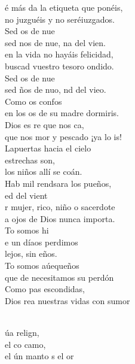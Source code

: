 \documentclass[12pt]{article}
\begin{document}
\begin{multicols*}{2}
\begin{cancion}%
	é más da la etiqueta que ponéis,\\
	no juzguéis y no seréiuzgados.\\
	Sed os de nue \\
	sed nos de nue, na del vien. \\
	 en la vida no hayáis felicidad,\\
	buscad vuestro tesoro ondido.\\
	Sed os de nue \\
	sed ños de nuo, nd del vieo.\\
	Como os confos \\
	en los os de su madre dormiris.\\
	Dios es re que nos ca,\\
	que nos mor y pescado ¡ya lo is!\\
	Lapuertas hacia el cielo \\
estrechas son,\\
	los niños allí se coán.\\
	Hab mil rendsara los pueños,\\
	ed del vient\\
	r mujer, rico, niño o sacerdote\\
	a ojos de Dios nunca importa.\\
	To somos hi \\
	e un díaos perdimos\\
	 lejos, sin eños.\\
	To somos aúequeños\\
	que de  necesitamos su perdón\\
	Como pas escondidas,\\
	Dios rea nuestras vidas con sumor\\\jump\\
	\begin{chorus}%
	úa relign,  \\
	el co camo,\\
	el ún manto s el or \\
	\end{chorus}%
	\jump\\
\end{cancion}%


\end{multicols*}
\end{document}
